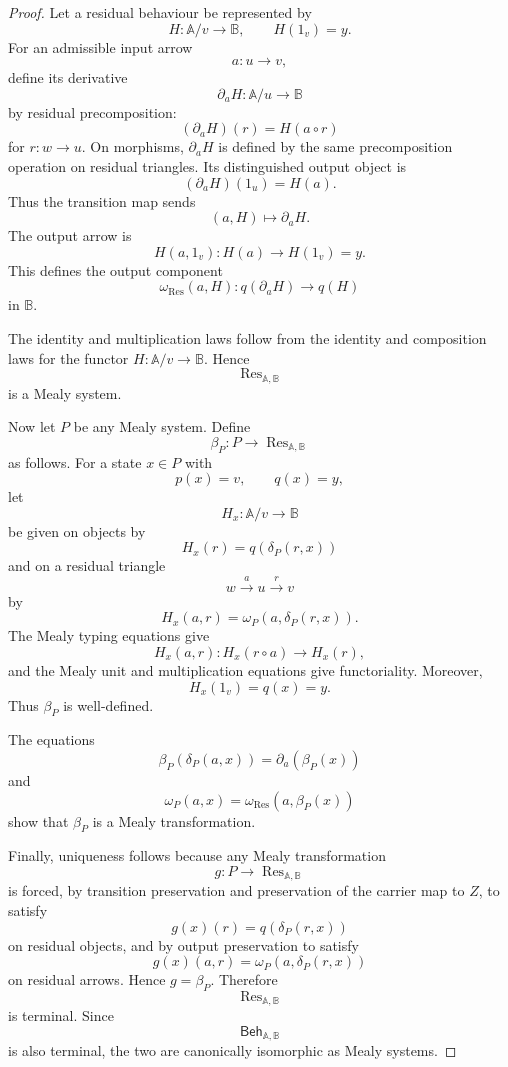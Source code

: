 \begin{proof}
Let a residual behaviour be represented by
\[
H:\mathbb A/v\to\mathbb B,
\qquad
H(1_v)=y.
\]
For an admissible input arrow
\[
a:u\to v,
\]
define its derivative
\[
\partial_a H:\mathbb A/u\to\mathbb B
\]
by residual precomposition:
\[
(\partial_aH)(r)=H(a\circ r)
\]
for \(r:w\to u\). On morphisms, \(\partial_aH\) is defined by the same
precomposition operation on residual triangles. Its distinguished output
object is
\[
(\partial_aH)(1_u)=H(a).
\]
Thus the transition map sends
\[
(a,H)\longmapsto \partial_aH.
\]
The output arrow is
\[
H(a,1_v):H(a)\to H(1_v)=y.
\]
This defines the output component
\[
\omega_{\operatorname{Res}}(a,H):q(\partial_aH)\to q(H)
\]
in \(\mathbb B\).

The identity and multiplication laws follow from the identity and composition
laws for the functor \(H:\mathbb A/v\to\mathbb B\). Hence
\[
\operatorname{Res}_{\mathbb A,\mathbb B}
\]
is a Mealy system.

Now let \(P\) be any Mealy system. Define
\[
\beta_P:P\to\operatorname{Res}_{\mathbb A,\mathbb B}
\]
as follows. For a state \(x\in P\) with
\[
p(x)=v,
\qquad
q(x)=y,
\]
let
\[
H_x:\mathbb A/v\to\mathbb B
\]
be given on objects by
\[
H_x(r)=q(\delta_P(r,x))
\]
and on a residual triangle
\[
w\xrightarrow{a}u\xrightarrow{r}v
\]
by
\[
H_x(a,r)=\omega_P(a,\delta_P(r,x)).
\]
The Mealy typing equations give
\[
H_x(a,r):
H_x(r\circ a)\to H_x(r),
\]
and the Mealy unit and multiplication equations give functoriality. Moreover,
\[
H_x(1_v)=q(x)=y.
\]
Thus \(\beta_P\) is well-defined.

The equations
\[
\beta_P(\delta_P(a,x))=\partial_a(\beta_P(x))
\]
and
\[
\omega_P(a,x)=\omega_{\operatorname{Res}}(a,\beta_P(x))
\]
show that \(\beta_P\) is a Mealy transformation.

Finally, uniqueness follows because any Mealy transformation
\[
g:P\to\operatorname{Res}_{\mathbb A,\mathbb B}
\]
is forced, by transition preservation and preservation of the carrier map to
\(Z\), to satisfy
\[
g(x)(r)=q(\delta_P(r,x))
\]
on residual objects, and by output preservation to satisfy
\[
g(x)(a,r)=\omega_P(a,\delta_P(r,x))
\]
on residual arrows. Hence \(g=\beta_P\). Therefore
\[
\operatorname{Res}_{\mathbb A,\mathbb B}
\]
is terminal. Since
\[
\mathsf{Beh}_{\mathbb A,\mathbb B}
\]
is also terminal, the two are canonically isomorphic as Mealy systems.
\end{proof}

